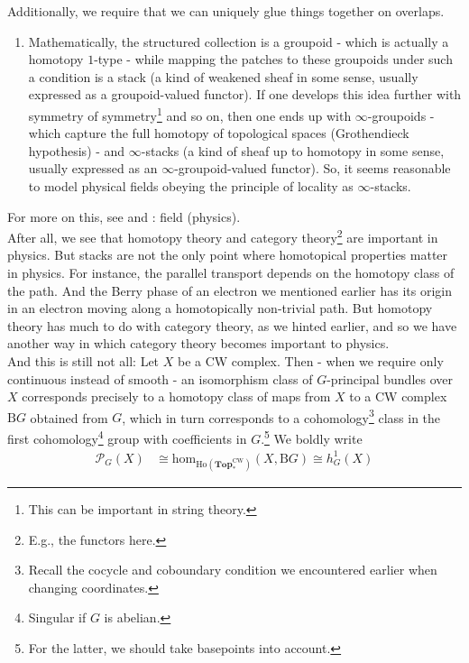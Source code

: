 \begin{enumerate}
Additionally, we require that we can uniquely glue things together on overlaps.
\begin{enumerate}
\item[$\pmb{\hookrightarrow}$]
Mathematically, the structured collection is a groupoid - which is actually a homotopy $1$-type - while mapping the patches to these groupoids under such a condition is a stack (a kind of weakened sheaf in some sense, usually expressed as a groupoid-valued functor).
If one develops this idea further with symmetry of symmetry\footnote{This can be important in string theory.} and so on, then one ends up with $\infty$-groupoids - which capture the full homotopy of topological spaces (Grothendieck hypothesis) - and $\infty$-stacks (a kind of sheaf up to homotopy in some sense, usually expressed as an $\infty$-groupoid-valued functor).
So, it seems reasonable to model physical fields obeying the principle of locality as $\infty$-stacks.
\end{enumerate}
For more on this, see \cite{d1ad46b9} and \cite{wiki-nlab0000}: field (physics).
\\
After all, we see that homotopy theory and category theory\footnote{E.g., the functors here.} are important in physics.
But stacks are not the only point where homotopical properties matter in physics.
For instance, the parallel transport depends on the homotopy class of the path.
And the Berry phase of an electron we mentioned earlier has its origin in an electron moving along a homotopically non-trivial path.
But homotopy theory has much to do with category theory, as we hinted earlier, and so we have another way in which category theory becomes important to physics.
\\
And this is still not all: Let $X$ be a CW complex.
Then - when we require only continuous instead of smooth - an isomorphism class of $G$-principal bundles over $X$ corresponds precisely to a homotopy class of maps from $X$ to a CW complex $\mathrm{B}G$ obtained from $G$, which in turn corresponds to a cohomology\footnote{Recall the cocycle and coboundary condition we encountered earlier when changing coordinates.} class in the first cohomology\footnote{Singular if $G$ is abelian.} group with coefficients in $G$.\footnote{For the latter, we should take basepoints into account.}
We boldly write
\begin{align*}
  \mathcal{P}_{G}(X)
  &\cong
  \mathrm{hom}_{\mathrm{Ho}(\mathbf{Top}_{\ast}^{\textrm{CW}})}
  \left(
    X,
    \mathrm{B}G
  \right)
  \cong
  h_{G}^{1}(X)
\end{align*}

\end{enumerate}
